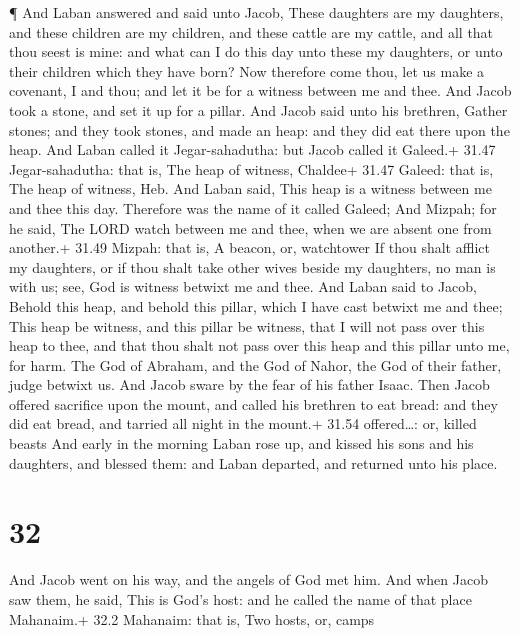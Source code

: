  ¶ And Laban answered and said unto Jacob, These daughters
are my daughters, and these children are my children, and these cattle
are my cattle, and all that thou seest is mine: and what can I do this
day unto these my daughters, or unto their children which they have
born?  Now therefore come thou, let us make a covenant, I
and thou; and let it be for a witness between me and thee. 
And Jacob took a stone, and set it up for a pillar.  And
Jacob said unto his brethren, Gather stones; and they took stones, and
made an heap: and they did eat there upon the heap.  And
Laban called it Jegar-sahadutha: but Jacob called it Galeed.+ 31.47
Jegar-sahadutha: that is, The heap of witness, Chaldee+ 31.47 Galeed:
that is, The heap of witness, Heb.  And Laban said, This
heap is a witness between me and thee this day. Therefore was the name
of it called Galeed;  And Mizpah; for he said, The LORD
watch between me and thee, when we are absent one from another.+ 31.49
Mizpah: that is, A beacon, or, watchtower  If thou shalt
afflict my daughters, or if thou shalt take other wives beside my
daughters, no man is with us; see, God is witness betwixt me and thee.
 And Laban said to Jacob, Behold this heap, and behold this
pillar, which I have cast betwixt me and thee;  This heap
be witness, and this pillar be witness, that I will not pass over this
heap to thee, and that thou shalt not pass over this heap and this
pillar unto me, for harm.  The God of Abraham, and the God
of Nahor, the God of their father, judge betwixt us. And Jacob sware by
the fear of his father Isaac.  Then Jacob offered sacrifice
upon the mount, and called his brethren to eat bread: and they did eat
bread, and tarried all night in the mount.+ 31.54 offered\ldots: or,
killed beasts  And early in the morning Laban rose up, and
kissed his sons and his daughters, and blessed them: and Laban departed,
and returned unto his place.

\hypertarget{section-31}{%
\section{32}\label{section-31}}

 And Jacob went on his way, and the angels of God met him.
 And when Jacob saw them, he said, This is God's host: and
he called the name of that place Mahanaim.+ 32.2 Mahanaim: that is, Two
hosts, or, camps


